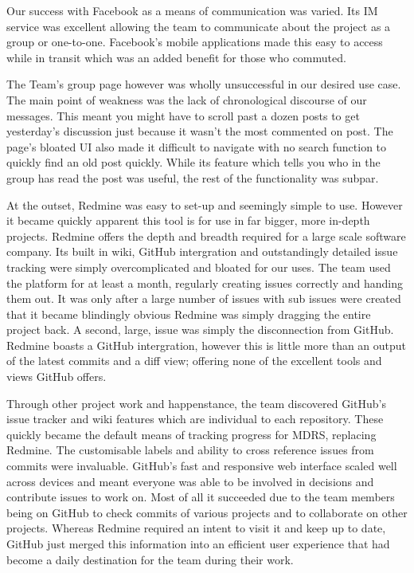 \documentclass{l3proj}
\begin{document}
Our success with Facebook as a means of communication was varied. Its IM service was excellent allowing the team to communicate about the project as a group or one-to-one. Facebook's mobile applications made this easy to access while in transit which was an added benefit for those who commuted.

The Team's group page however was wholly unsuccessful in our desired use case. The main point of weakness was the lack of chronological discourse of our messages. This meant you might have to scroll past a dozen posts to get yesterday's discussion just because it wasn't the most commented on post. The page's bloated UI also made it difficult to navigate with no search function to quickly find an old post quickly. While its feature which tells you who in the group has read the post was useful, the rest of the functionality was subpar.

At the outset, Redmine was easy to set-up and seemingly simple to use. However it became quickly apparent this tool is for use in far bigger, more in-depth projects.
Redmine offers the depth and breadth required for a large scale software company. Its built in wiki, GitHub intergration and outstandingly detailed issue tracking were simply overcomplicated and bloated for our uses. The team used the platform for at least a month, regularly creating issues correctly and handing them out. It was only after a large number of issues with sub issues were created that it became blindingly obvious Redmine was simply dragging the entire project back. A second, large, issue was simply the disconnection from GitHub. Redmine boasts a GitHub intergration, however this is little more than an output of the latest commits and a diff view; offering none of the excellent tools and views GitHub offers.

Through other project work and happenstance, the team discovered GitHub's issue tracker and wiki features which are individual to each repository. These quickly became the default means of tracking progress for MDRS, replacing Redmine. The customisable labels and ability to cross reference issues from commits were invaluable. GitHub's fast and responsive web interface scaled well across devices and meant everyone was able to be involved in decisions and contribute issues to work on. Most of all it succeeded due to the team members being on GitHub to check commits of various projects and to collaborate on other projects. Whereas Redmine required an intent to visit it and keep up to date, GitHub just merged this information into an efficient user experience that had become a daily destination for the team during their work.
\end{document}
